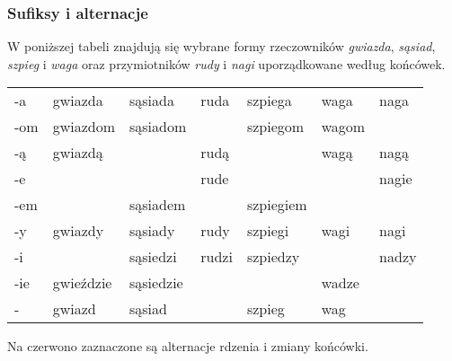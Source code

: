 \documentclass{beamer}
\begin{document}
\begin{frame}
\frametitle{Sufiksy i alternacje}
W poniższej tabeli znajdują się wybrane formy rzeczowników {\it gwiazda}, {\it sąsiad}, {\it szpieg} i {\it waga} oraz przymiotników {\it rudy} i {\it nagi} uporządkowane według końcówek.

\begin{center}
\begin{tabular}{l|l|l|l|l|l|l}
-a & gwiazda & sąsiada & ruda & szpiega & waga & naga \\
-om & gwiazdom & sąsiadom &  & szpiegom & wagom &  \\
-ą & gwiazdą &  & rudą &  & wagą & nagą \\
-e &  &  & rude & & & nag{\color{red}i}e \\
-em &  & sąsiadem & & szpieg{\color{red}i}em &  &  \\
-y & gwiazdy & sąsiady & rudy & szpieg{\color{red}i} & wag{\color{red}i} & nag{\color{red}i} \\
-i &  & sąsi{\color{red}edz}i & ru{\color{red}dz}i & szpie{\color{red}dzy} &  & na{\color{red}dzy} \\
-ie & gwi{\color{red}eźdz}ie & sąsi{\color{red}edz}ie &  &  & wa{\color{red}dz}e &  \\
- & gwiazd & sąsiad &  & szpieg & wag &  \\
\end{tabular}
\end{center}
Na czerwono zaznaczone są alternacje rdzenia i zmiany końcówki.
\end{frame}
\end{document}
